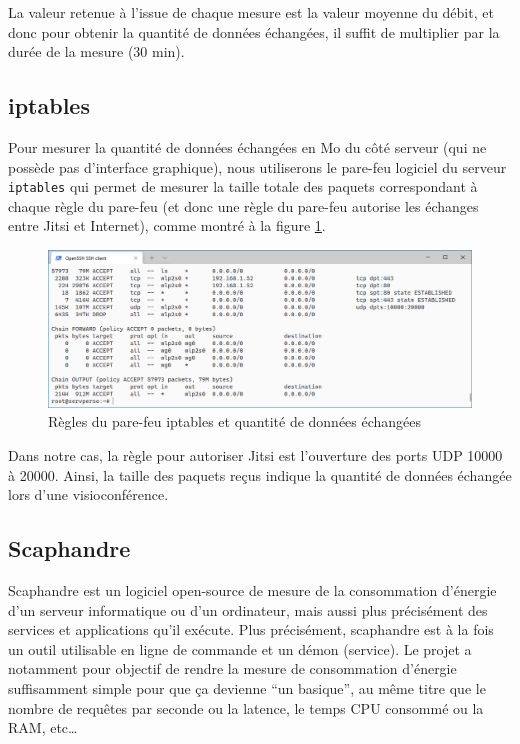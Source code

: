 \documentclass[11pt,a4paper]{report}
\begin{document}
La valeur retenue à l'issue de chaque mesure est la valeur moyenne du débit, et donc pour obtenir la quantité de données échangées, il suffit de multiplier par la durée de la mesure (30 min).

\subsection{iptables}
Pour mesurer la quantité de données échangées en Mo du côté serveur (qui ne possède pas d'interface graphique), nous utiliserons le pare-feu logiciel du serveur \texttt{iptables} qui permet de mesurer la taille totale des paquets correspondant à chaque règle du pare-feu (et donc une règle du pare-feu autorise les échanges entre Jitsi et Internet), comme montré à la figure \ref{fig:iptables}.
\begin{figure}[!h]
    \centering
    \includegraphics[scale=0.5]{iptables.PNG}
    \caption{Règles du pare-feu iptables et quantité de données échangées}
    \label{fig:iptables}
\end{figure}

Dans notre cas, la règle pour autoriser Jitsi est l'ouverture des ports UDP 10000 à 20000. Ainsi, la taille des paquets reçus indique la quantité de données échangée lors d'une visioconférence.


\subsection{Scaphandre}
Scaphandre est  un logiciel open-source de mesure de la consommation d'énergie d’un serveur informatique ou d'un ordinateur, mais aussi plus précisément des services et applications qu’il exécute. Plus précisément, scaphandre est à la fois un outil utilisable en ligne de commande et un démon (service).
Le projet a notamment pour objectif de rendre la mesure de consommation d'énergie suffisamment simple pour que ça devienne “un basique”, au même titre que le nombre de requêtes par seconde ou la latence, le temps CPU consommé ou la RAM, etc…
\end{document}
